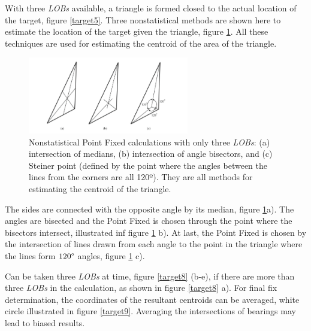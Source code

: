 \documentclass[english,purist]{ist-report}
\begin{document}
With three \textit{LOBs} available, a triangle is formed closed to the actual location of the target, figure \ref{target5}. Three nonstatistical methods are shown here to estimate the location of the target given the triangle, figure \ref{target7}.  All these techniques are used for estimating the centroid of the area of the triangle. 

\begin{figure}[ht]
\centering
\includegraphics[width=70mm]{target7.png}
\caption{Nonstatistical Point Fixed calculations with only three \textit{LOBs}: (a) intersection of medians, (b)
intersection of angle bisectors, and (c) Steiner point (defined by the point where the angles between the lines from the corners are all 120º). They are all methods for estimating the centroid of the triangle.}
\label{target7}
\end{figure} 



The sides are connected with the opposite angle by its median, figure \ref{target7}a). The angles are bisected and the Point Fixed is chosen through the point where the bisectors intersect, illustrated inf figure \ref{target7} b). At last, the Point Fixed is chosen by the intersection of lines drawn from each angle to the point in the triangle where the lines form $120\degree$ angles, figure \ref{target7} c).  

Can be taken three \textit{LOBs} at time, figure \ref{target8} (b-e), if there are more than three \textit{LOBs} in the calculation, as shown in figure \ref{target8} a). For final fix determination, the coordinates of the resultant centroids can be averaged, white circle illustrated in figure \ref{target9}. Averaging the intersections of bearings may lead to biased results. 
\end{document}
